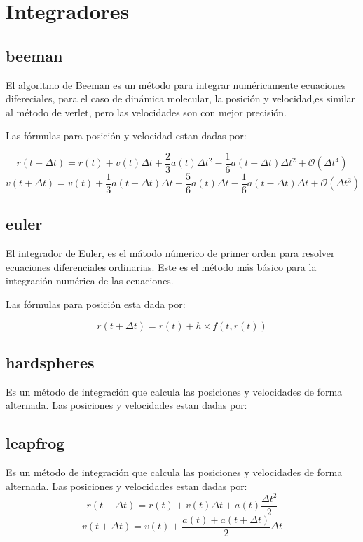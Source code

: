 \section{Integradores}
\subsection{beeman}
El algoritmo de Beeman es un m\'etodo para integrar num\'ericamente ecuaciones difereciales, para el caso de din\'amica molecular, la posici\'on y velocidad,es similar al m\'etodo de verlet, pero las velocidades son con mejor precisi\'on.

Las f\'ormulas para posici\'on y velocidad estan dadas por:

$$r(t+\Delta t) = r(t) + v(t)\Delta t + \frac{2}{3}a(t)\Delta t^2 - \frac{1}{6}a(t-\Delta t)\Delta t^2 +\mathcal{O}(\Delta t^4)$$
$$v(t+\Delta t) = v(t) + \frac{1}{3}a(t+\Delta t)\Delta t+\frac{5}{6}a(t)\Delta t-\frac{1}{6}a(t-\Delta t)\Delta t+\mathcal{O}(\Delta t^3)$$

\subsection{euler}
El integrador de Euler, es el m\'atodo n\'umerico de primer orden para resolver ecuaciones diferenciales ordinarias. Este es el m\'etodo m\'as b\'asico para la integraci\'on num\'erica de las ecuaciones.

Las f\'ormulas para posici\'on esta dada por:

$$r(t+\Delta t) = r(t) + h\times f(t,r(t))$$

\subsection{hardspheres}
Es un m\'etodo de integraci\'on que calcula las posiciones y velocidades de forma alternada. Las posiciones y velocidades estan dadas por:

\subsection{leapfrog}
Es un m\'etodo de integraci\'on que calcula las posiciones y velocidades de forma alternada. Las posiciones y velocidades estan dadas por:
$$r(t+\Delta t) = r(t) + v(t)\Delta t + a(t)\frac{\Delta t^2}{2}$$
$$v(t+\Delta t) = v(t) + \frac{a(t)+a(t+\Delta t)}{2}\Delta t$$

